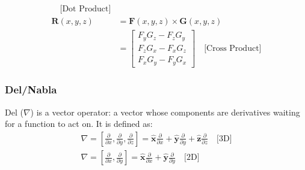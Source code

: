 \begin{enumerate}
\begin{enumerate}
\begin{align*}
                   \hspace{1em} \text{[Dot Product]} \\
        \mathbf{R}(x, y, z) &= \mathbf{F}(x, y, z) \times \mathbf{G}(x, y, z) \\
                             &= \begin{bmatrix}
                                  F_y G_z - F_z G_y \\
                                  F_z G_x - F_x G_z \\
                                  F_x G_y - F_y G_x
                                \end{bmatrix}
                   \hspace{1em} \text{[Cross Product]}
      \end{align*}
    \end{enumerate}
\end{enumerate}

\subsubsection{Del/Nabla}
Del (\(\nabla\)) is a vector operator: a vector whose components are
derivatives waiting for a function to act on. It is defined as:
\begin{align*}
  \nabla = \left[\frac{\partial}{\partial x}, \frac{\partial}{\partial y}, \frac{\partial}{\partial z}\right] = \hat{\mathbf{x}} \frac{\partial}{\partial x} + \hat{\mathbf{y}} \frac{\partial}{\partial y} + \hat{\mathbf{z}} \frac{\partial}{\partial z} \hspace{1em} \text{[3D]} \\
  \nabla = \left[\frac{\partial}{\partial x}, \frac{\partial}{\partial y}\right] = \hat{\mathbf{x}} \frac{\partial}{\partial x} + \hat{\mathbf{y}} \frac{\partial}{\partial y} \hspace{1em} \text{[2D]}
\end{align*}

